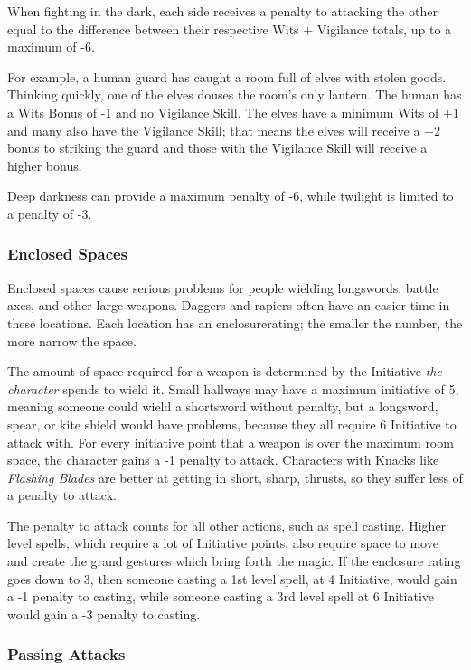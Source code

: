 \begin{multicols}{2}
When fighting in the dark, each side receives a penalty to attacking the other equal to the difference between their respective Wits + Vigilance totals, up to a maximum of -6.

For example, a human guard has caught a room full of elves with stolen goods. Thinking quickly, one of the elves douses the room's only lantern. The human has a Wits Bonus of -1 and no Vigilance Skill. The elves have a minimum Wits of +1 and many also have the Vigilance Skill; that means the elves will receive a +2 bonus to striking the guard and those with the Vigilance Skill will receive a higher bonus.

Deep darkness can provide a maximum penalty of -6, while twilight is limited to a penalty of -3.

\subsubsection{Enclosed Spaces}
\label{enclosedcombat}

Enclosed spaces cause serious problems for people wielding longswords, battle axes, and other large weapons.
Daggers and rapiers often have an easier time in these locations.
Each location has an \gls{enclosurerating}; the smaller the number, the more narrow the space.

The amount of space required for a weapon is determined by the Initiative \textit{the character} spends to wield it.
Small hallways may have a maximum initiative of 5, meaning someone could wield a shortsword without penalty, but a longsword, spear, or kite shield would have problems, because they all require 6 Initiative to attack with.
For every initiative point that a weapon is over the maximum room space, the character gains a -1 penalty to attack.
Characters with Knacks like \textit{Flashing Blades} are better at getting in short, sharp, thrusts, so they suffer less of a penalty to attack.

The penalty to attack counts for all other actions, such as spell casting.
Higher level spells, which require a lot of Initiative points, also require space to move and create the grand gestures which bring forth the magic.
If the enclosure rating goes down to 3, then someone casting a 1st level spell, at 4 Initiative, would gain a -1 penalty to casting, while someone casting a 3rd level spell at 6 Initiative would gain a -3 penalty to casting.

\subsubsection{Passing Attacks}


\end{multicols}

